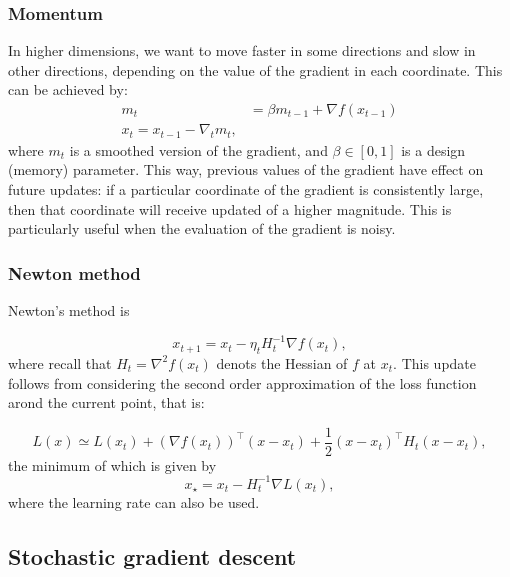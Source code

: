 \subsubsection{Momentum}
\label{ssub:momentum}

In higher dimensions, we want to move faster in some directions and slow in other directions, depending on the value of the gradient in each coordinate. This can be achieved by: 
\begin{align}
	m_t &= \beta m_{t-1} + \nabla f(x_{t-1})\\
	x_t = x_{t-1} - \nabla_t m_t,
\end{align}
where $m_t$ is a smoothed version of the gradient, and $\beta\in[0,1]$ is a design (memory) parameter. This way, previous values of the gradient have effect on future updates: if a particular coordinate of the gradient is consistently large, then that coordinate will receive updated of a higher magnitude. This is particularly useful when the evaluation of the gradient is noisy. 

\subsubsection{Newton method}
\label{ssub:newton}
Newton's method is

\begin{equation}
	x_{t+1} = x_t -\eta_t H_t^{-1}\nabla f(x_t),	
\end{equation}
where recall that $H_t = \nabla^2 f(x_t)$ denots the Hessian of $f$ at $x_t$. This update follows from considering the second order approximation of the loss function arond the current point, that is: 

\begin{equation}
	L(x) \simeq L(x_t) + (\nabla f(x_t))^\top(x-x_t) + \frac{1}{2} (x-x_t)^\top H_t  (x-x_t),
\end{equation}
the minimum of which is given by 
\begin{equation}
	x_\star = x_t - H^{-1}_t\nabla L(x_t),
\end{equation}
where the learning rate can also be used. 

\begin{mdframed}[style=ejemplo, frametitle={\center Example: convergence for a parabola (2)}]


\end{mdframed}



\subsection{Stochastic gradient descent}
\label{sub:SGD}





